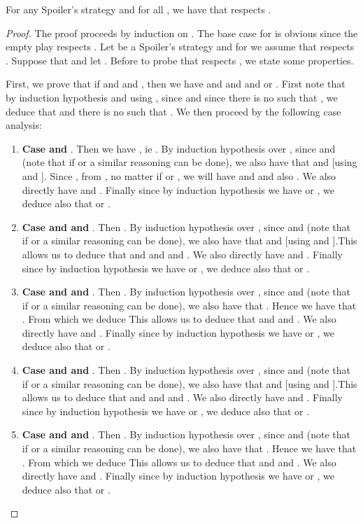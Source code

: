 \begin{lemma}
\label{lem-strat-win}
For any Spoiler's strategy  and for all , we have that  respects .
\end{lemma}
\begin{proof}
The proof proceeds by induction on . The base case for  is obvious since the empty play respects . Let  be a Spoiler's strategy and for  we assume that  respects . Suppose that  and let . Before to probe that  respects , we state some properties.

First, we prove that if  and  and , then we have  and  and  and  or . First note that by induction hypothesis and using , since  and since there is no  such that , we deduce that  and there is no  such that . We then proceed by the following case analysis:

\begin{enumerate}
\item \textbf{Case  and }. Then we have , ie . By induction hypothesis over , since  and  (note that if  or  a similar reasoning can be done),  we also have that   and  [using  and ]. Since , from , no matter if  or , we will have  and  and also . We also directly have  and . Finally since by induction hypothesis we have  or , we deduce also that  or .
\item \textbf{Case  and  and }. Then .  By induction hypothesis over , since  and  (note that if  or  a similar reasoning can be done),  we also have that   and  [using  and ].This allows us to deduce that  and  and   and . We also directly have  and . Finally since by induction hypothesis we have  or , we deduce also that  or .
\item \textbf{Case  and  and }. Then .  By induction hypothesis over , since  and  (note that if  or  a similar reasoning can be done),  we also have that  . Hence we have that . From which we deduce  This allows us to deduce that   and  and . We also directly have  and . Finally since by induction hypothesis we have  or , we deduce also that  or .
\item \textbf{Case  and  and }. Then .  By induction hypothesis over , since  and  (note that if  or  a similar reasoning can be done),  we also have that   and  [using  and ].This allows us to deduce that  and  and   and . We also directly have  and . Finally since by induction hypothesis we have  or , we deduce also that  or .
\item \textbf{Case  and  and }. Then .  By induction hypothesis over , since  and  (note that if  or  a similar reasoning can be done),  we also have that   . Hence we have that . From which we deduce  This allows us to deduce that   and  and . We also directly have  and . Finally since by induction hypothesis we have  or , we deduce also that  or .

\end{enumerate}
\end{proof}
